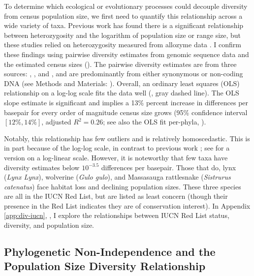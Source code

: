 \documentclass[9pt,lineno]{elife}
\begin{document}
To determine which ecological or evolutionary processes could decouple
diversity from census population size, we first need to quantify this
relationship across a wide variety of taxa. Previous work has found there is a
significant relationship between heterozygosity and the logarithm of population
size or range size, but these studies relied on heterozygosity measured from
allozyme data \citep{Soule1976-he,Frankham1996-yb,Nei1984-zi}. I confirm these
findings using pairwise diversity estimates from genomic sequence data and the
estimated census sizes (). The pairwise diversity estimates are from
three sources: \cite{Leffler2012-zj}, \cite{Corbett-Detig2015-gt}, and
\cite{Romiguier2014-bp}, and are predominantly from either synonymous or
non-coding DNA (see Methods and Materials: ).
Overall, an ordinary least squares (OLS) relationship on a log-log scale fits
the data well (, gray dashed line). The OLS slope estimate is
significant and implies a 13\% percent increase in differences per basepair for
every order of magnitude census size grows (95\% confidence interval $[12\%,
14\%]$, adjusted $R^2 = 0.26$; see also the OLS fit per-phyla,
).

Notably, this relationship has few outliers and is relatively homoscedastic.
This is in part because of the log-log scale, in contrast to previous work
\citep{Nei1984-zi,Soule1976-he}; see  for a
version on a log-linear scale. However, it is noteworthy that few taxa have
diversity estimates below $10^{-3.5}$ differences per basepair. Those that do,
lynx (\emph{Lynx Lynx}), wolverine (\emph{Gulo gulo}), and Massasauga
rattlesnake (\emph{Sistrurus catenatus}) face habitat loss and declining
population sizes. These three species are all in the IUCN Red List, but are
listed as least concern (though their presence in the Red List indicates they
are of conservation interest). In Appendix \ref{app:div-iucn},
, I explore the relationships between IUCN Red List
status, diversity, and population size.

\subsection{Phylogenetic Non-Independence and the Population Size Diversity Relationship}
\end{document}

